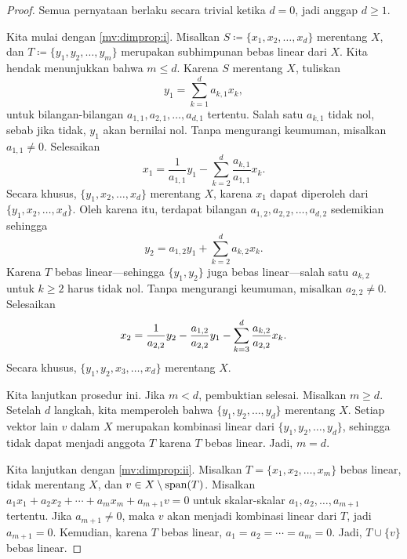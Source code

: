 \begin{proof}
Semua pernyataan berlaku secara trivial ketika $d=0$, jadi anggap $d \geq 1$.

Kita mulai dengan \ref{mv:dimprop:i}.
Misalkan $S \coloneqq \{ x_1 , x_2, \ldots, x_d \}$ merentang $X$, dan
$T \coloneqq \{ y_1, y_2, \ldots, y_m \}$ merupakan subhimpunan bebas
linear dari $X$.  Kita hendak menunjukkan bahwa $m \leq d$.
Karena $S$ merentang $X$,
tuliskan
\begin{equation*}
y_1 = \sum_{k=1}^d a_{k,1} x_k ,
\end{equation*}
untuk bilangan-bilangan $a_{1,1},a_{2,1},\ldots,a_{d,1}$ tertentu.
Salah satu
$a_{k,1}$ tidak nol, sebab jika tidak, $y_1$ akan bernilai nol.
Tanpa mengurangi keumuman, misalkan $a_{1,1} \neq 0$.  Selesaikan
\begin{equation*}
x_1 = \frac{1}{a_{1,1}} y_1 - \sum_{k=2}^d \frac{a_{k,1}}{a_{1,1}} x_k .
\end{equation*}
Secara khusus, $\{ y_1 , x_2, \ldots, x_d \}$ merentang $X$, karena $x_1$ dapat
diperoleh dari $\{ y_1 , x_2, \ldots, x_d \}$.  Oleh karena itu, terdapat bilangan
$a_{1,2},a_{2,2},\ldots,a_{d,2}$ sedemikian sehingga
\begin{equation*}
y_2 = a_{1,2} y_1 + \sum_{k=2}^d a_{k,2} x_k .
\end{equation*}
Karena $T$ bebas linear---sehingga $\{ y_1, y_2 \}$ juga bebas
linear---salah satu $a_{k,2}$
untuk $k \geq 2$ harus tidak nol.  Tanpa mengurangi keumuman, misalkan 
$a_{2,2} \neq 0$.  Selesaikan
\begin{equation*}
x_2 = \frac{1}{a_{2,2}} y_2 - \frac{a_{1,2}}{a_{2,2}} y_1 - \sum_{k=3}^d
\frac{a_{k,2}}{a_{2,2}} x_k .
\avoidbreak
\end{equation*}
Secara khusus,
$\{ y_1 , y_2, x_3, \ldots, x_d \}$ merentang $X$.

Kita lanjutkan prosedur ini.  Jika $m < d$, pembuktian selesai.  Misalkan
$m \geq d$.
Setelah $d$ langkah, kita memperoleh bahwa 
$\{ y_1 , y_2, \ldots, y_d \}$ merentang $X$.  Setiap
vektor lain $v$ dalam $X$ merupakan kombinasi linear dari
$\{ y_1 , y_2, \ldots, y_d \}$, sehingga tidak dapat menjadi anggota $T$ karena $T$
bebas linear.  Jadi, $m = d$.

Kita lanjutkan dengan \ref{mv:dimprop:ii}.
Misalkan 
$T = \{x_1,x_2,\ldots,x_m\}$ bebas linear,
tidak merentang $X$, dan $v \in X \setminus \operatorname{span} (T)$.
Misalkan 
$a_1 x_1 + a_2 x_2 + \cdots + a_m x_m + a_{m+1} v = 0$
untuk skalar-skalar $a_1,a_2,\ldots,a_{m+1}$ tertentu.
Jika $a_{m+1} \neq 0$, maka $v$ akan menjadi kombinasi linear dari $T$,
jadi $a_{m+1} = 0$.  Kemudian, karena $T$ bebas linear, $a_1=a_2=\cdots=a_m = 0$.
Jadi, $T \cup \{ v \}$ bebas linear.


\end{proof}
